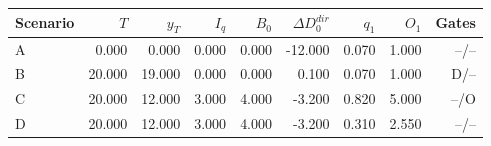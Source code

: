 \begin{tabular}{lrrrrrrrr}
\toprule
Scenario & $T$ & $y_T$ & $I_q$ & $B_0$ & $\Delta D_0^{dir}$ & $q_1$ & $O_1$ & Gates \\
\midrule
A & 0.000 & 0.000 & 0.000 & 0.000 & -12.000 & 0.070 & 1.000 & --/-- \\
B & 20.000 & 19.000 & 0.000 & 0.000 & 0.100 & 0.070 & 1.000 & D/-- \\
C & 20.000 & 12.000 & 3.000 & 4.000 & -3.200 & 0.820 & 5.000 & --/O \\
D & 20.000 & 12.000 & 3.000 & 4.000 & -3.200 & 0.310 & 2.550 & --/-- \\
\bottomrule
\end{tabular}
